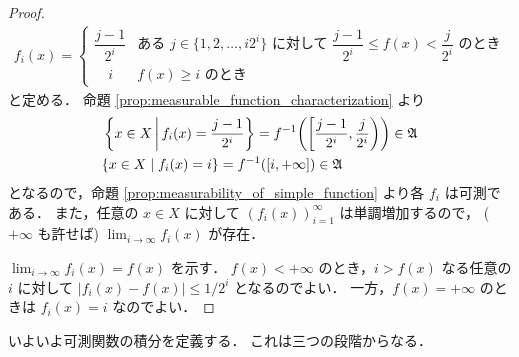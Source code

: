 \begin{proof}
    \begin{align*}
        f_i(x)=\begin{cases}
            \dfrac{j-1}{2^i}&\text{ある $j\in\{1,2,\ldots,i2^i\}$ に対して $\dfrac{j-1}{2^i}\le f(x)<\dfrac{j}{2^i}$ のとき}\\
            \quad i&\text{$f(x)\ge i$ のとき}
        \end{cases}
    \end{align*}
    と定める．
    命題 \ref{prop:measurable_function_characterization} より
    \begin{align*}
        &\left\{x\in X\,\middle\vert\,f_i(x)=\dfrac{j-1}{2^i}\right\}
        =f^{-1}\biggl(\biggl[\dfrac{j-1}{2^i},\dfrac{j}{2^i}\biggr)\biggr)\in\mathfrak{A}\\
        &\{x\in X\mid f_i(x)=i\}=f^{-1}([i,+\infty])\in\mathfrak{A}
    \end{align*}
    となるので，命題 \ref{prop:measurability_of_simple_function} より各 $f_i$ は可測である．
    また，任意の $x\in X$ に対して $(f_i(x))_{i=1}^\infty$ は単調増加するので，
    ($+\infty$ も許せば) $\displaystyle\lim_{i\to\infty}f_i(x)$ が存在．

    $\displaystyle\lim_{i\to\infty}f_i(x)=f(x)$ を示す．
    $f(x)<+\infty$ のとき，$i>f(x)$ なる任意の $i$ に対して $|f_i(x)-f(x)|\le1/2^i$ となるのでよい．
    一方，$f(x)=+\infty$ のときは $f_i(x)=i$ なのでよい．
\end{proof}

いよいよ可測関数の積分を定義する．
これは三つの段階からなる．

